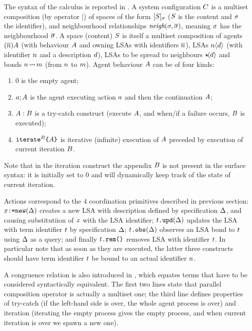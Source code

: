 \documentclass[12pt,a4paper,twoside,openright]{book}
\begin{document}
The syntax of the calculus is reported in . A system configuration $C$ is a multiset composition (by operator $|$) of spaces of the form $[S]_{\sigma}$ ($S$ is the content and $\sigma$ the identifier), and neighbourhood relationships $\textit{neigh}(\sigma,\overline{\sigma})$, meaning $\sigma$ has the neighbourhood $\overline{\sigma}$.
%
A space (content) $S$ is itself a multiset composition of agents $(\overline{n})A$ (with behaviour $A$ and owning LSAs with identifiers $\overline{n}$), LSAs $n\langle d\rangle$ (with identifier $n$ and a description $d$), LSAs to be spread to  neighbours $\star\!\langle d\rangle$ and bonds $n\!\rightsquigarrow \! m$ (from $n$ to $m$).
%
Agent behaviour $A$ can be of four kinds:
\begin{enumerate}
 \item $0$ is the empty agent;
 \item $a ; A$ is the agent executing action $a$ and then the continuation $A$;
 \item $A:B$ is a try-catch construct (execute $A$, and when/if a failure occurs, $B$ is executed);
 \item $\texttt{iterate${}^{B}$\{$A$\}}$ is iterative (infinite) execution of $A$ preceded by execution of current iteration $B$.
\end{enumerate}
%
Note that in the iteration construct the appendix $B$ is not present in the surface syntax: it is initially set to $0$ and will dynamically keep track of the state of current iteration.

Actions correspond to the $4$ coordination primitives described in previous section: $x\texttt{:=new}(\Delta)$ creates a new LSA with description defined by specification $\Delta$, and causing substitutiion of $x$ with the LSA identifier; $t\texttt{.upd}(\Delta)$ updates the LSA with term identifier $t$ by specification $\Delta$; $t\texttt{.obs}(\Delta)$ observes an LSA bond to $t$ using $\Delta$ as a query; and finally $t\texttt{.rem()}$ removes LSA with identifier $t$. In particular note that as soon as they are executed, the latter three constructs should have term identifier $t$ be bound to an actual identifier $n$.

A congruence relation is also introduced in , which equates terms that have to be considered syntactically equivalent. The first two lines state that parallel composition operator is actually a multiset one; the third line defines properties of try-catch (if the left-hand side is over, the whole agent process is over) and iteration (iterating the empty process gives the empty process, and when current iteration is over we spawn a new one).
\end{document}
